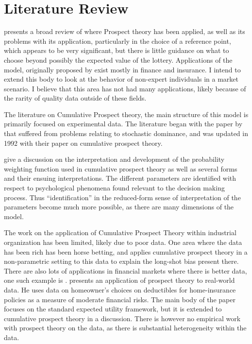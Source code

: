 \documentclass[12pt]{paper}
\begin{document}
\section{Literature Review}

\cite*{LitReview} presents a broad review of where Prospect theory has
been applied, as well as its problems with its application,
particularly in the choice of a reference point, which appears to be
very significant, but there is little guidance on what to choose
beyond possibly the expected value of the lottery. Applications of the
model, originally proposed by \cite*{Kahn} exist mostly in finance and
insurance. I intend to extend this body to look at the behavior of
non-expert individuals in a market scenario. I believe that this area
has not had many applications, likely because of the rarity of quality
data outside of these fields.

The literature on Cumulative Prospect theory, the main structure of
this model is primarily focused on experimental data. The literature
began with the paper by \cite*{ProspectTheory} that suffered from
problems relating to stochastic dominance, and was updated in 1992
with their paper on cumulative prospect theory. 

\cite*{GONZALEZ1999129} give a discussion on the interpretation and
development of the probability weighting function used in cumulative
prospect theory as well as several forms and their ensuing
interpretations. The different parameters are identified with respect
to psychological phenomena found relevant to the decision making
process. Thus ``identification'' in the reduced-form sense of
interpretation of the parameters become much more possible, as there
are many dimensions of the model.

The work on the application of Cumulative Prospect Theory within
industrial organization has been limited, likely due to poor data. One
area where the data has been rich has been horse betting, and
\cite{Snowberg2010} applies cumulative prospect theory in a
non-parametric setting to this data to explain the long-shot bias
present there. There are also lots of applications in financial
markets where there is better data, one such example is \cite*{Thaler1995}.
\cite*{Sydnor2010} presents an application of prospect theory to real-world
data. He uses data on homeowner's choices on deductibles for
home-insurance policies as a measure of moderate financial risks. The
main body of the paper focuses on the standard expected utility
framework, but it is extended to cumulative prospect theory in a
discussion. There is however no empirical work with prospect theory on
the data, as there is substantial heterogeneity within the data.
\end{document}
